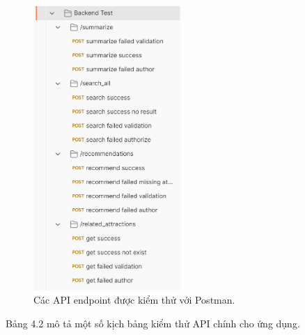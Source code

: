 \begin{figure}[H]
    \centering  
    \includegraphics[width=0.5\textwidth]{figures/c4/api_test.png}
    \caption{Các API endpoint được kiểm thử với Postman.}
    \label{fig:postman}
\end{figure}


Bảng 4.2 mô tả một số kịch bảng kiểm thử API chính cho ứng dụng. 

